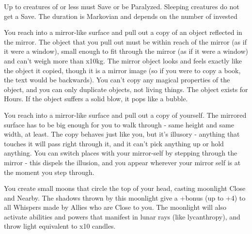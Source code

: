 \MYSTERY [
  Name = Paralysis,
  Link = arcana-mystery-paralysis,
  Paradigm = Mind,
  Save = Y (neg.),
  Duration = Markovian,
  Target = Close or Nearby Target(s)
]

Up to \DICE creatures of \DICE \HD or less must Save or be Paralyzed.  Sleeping creatures do not get a Save. The duration is Markovian and depends on the number of \DICE invested

\MYSTERY [
  Name = Strange Copy,
  Link = arcana-mystery-strange-copy,
  Paradigm = Mind,
  Save = N,
  Duration = \SUM Hours,
  Target = Close Target(s)
]

You reach into a mirror-like surface and pull out a copy of an object reflected in the mirror. The object that you pull out must be within reach of the mirror (as if it were a window), small enough to fit through the mirror (as if it were a window) and can't weigh more than \DICE x10kg. The mirror object looks and feels exactly like the object it copied, though it is a mirror image (so if you were to copy a book, the text would be backwards).  You can't copy any magical properties of the object, and you can only duplicate objects, not living things.  The object exists for \SUMDICE Hours.  If the object suffers a solid blow, it pops like a bubble.

\MYSTERY [
  Name = Twin,
  Link = arcana-mystery-twin,
  Paradigm = Mind,
  Save = N,
  Duration = \SUM Minutes,
  Target = Close Target(s)
]

You reach into a mirror-like surface and pull out a copy of yourself.  The mirrored surface has to be big enough for you to walk through - same height and same width, at least.  The copy behaves just like you, but it's illusory - anything that touches it will pass right through it, and it can't pick anything up or hold anything.  You can switch places with your mirror-self by stepping through the mirror - this dispels the illusion, and you appear wherever your mirror self is at the moment you step through.

\newpage

\MYSTERY [
  Name = Children of Shul,
  Link = arcana-mystery-children-of-shul,
  Paradigm = Prophesy,
  Save = Y (half),
  Duration = Session,
  Target = Self
]

You create \DICE small moons that circle the top of your head, casting moonlight Close and Nearby.  The shadows thrown by this moonlight give a +\DICE bonus (up to +4) to all Whispers made by Allies who are Close to you.  The moonlight will also activate abilities and powers that manifest in lunar rays (like lycanthropy), and throw light equivalent to \DICE x10 candles.

